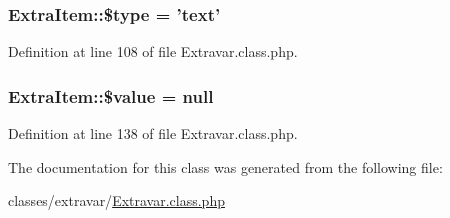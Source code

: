 \hypertarget{classExtraItem_ac965cc202d067c0449be9976045fd4be}{
\subsubsection[{\$type}]{\setlength{\rightskip}{0pt plus 5cm}Extra\+Item\+::\$type = 'text'}}\label{classExtraItem_ac965cc202d067c0449be9976045fd4be}


Definition at line 108 of file Extravar.\+class.\+php.

\hypertarget{classExtraItem_a46622b49026acdfce833d5118a43986d}{
\subsubsection[{\$value}]{\setlength{\rightskip}{0pt plus 5cm}Extra\+Item\+::\$value = null}}\label{classExtraItem_a46622b49026acdfce833d5118a43986d}


Definition at line 138 of file Extravar.\+class.\+php.



The documentation for this class was generated from the following file\+:\begin{DoxyCompactItemize}
\item 
classes/extravar/\hyperlink{Extravar_8class_8php}{Extravar.\+class.\+php}\end{DoxyCompactItemize}
